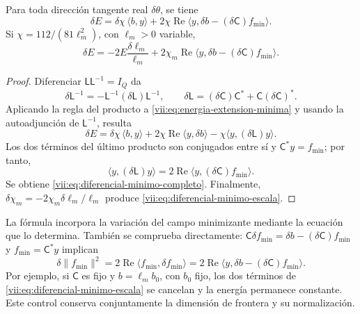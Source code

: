 \begin{theorem}
\label{vii:thm:diferencial-minimo}
Para toda dirección tangente real \(\delta\theta\), se tiene
\begin{equation}
 \delta E
 =\delta\chi\,\langle b,y\rangle
   +2\chi\operatorname{Re}
       \langle y,\delta b-(\delta\mathsf C)f_{\min}\rangle.
 \label{vii:eq:diferencial-minimo-completo}
\end{equation}
Si \(\chi=112/(81\ell_m^2)\), con \(\ell_m>0\) variable,
\begin{equation}
 \delta E=-2E\frac{\delta\ell_m}{\ell_m}
 +2\chi_m\operatorname{Re}
       \langle y,\delta b-(\delta\mathsf C)f_{\min}\rangle.
 \label{vii:eq:diferencial-minimo-escala}
\end{equation}
\end{theorem}

\begin{proof}
Diferenciar \(\mathsf L\mathsf L^{-1}=I_Q\) da
\[
 \delta\mathsf L^{-1}
 =-\mathsf L^{-1}(\delta\mathsf L)\mathsf L^{-1},\qquad
 \delta\mathsf L=(\delta\mathsf C)\mathsf C^*
                      +\mathsf C(\delta\mathsf C)^*.
\]
Aplicando la regla del producto a \eqref{vii:eq:energia-extension-minima}
y usando la autoadjunción de \(\mathsf L^{-1}\), resulta
\[
 \delta E=\delta\chi\,\langle b,y\rangle
 +2\chi\operatorname{Re}\langle y,\delta b\rangle
 -\chi\langle y,(\delta\mathsf L)y\rangle.
\]
Los dos términos del último producto son conjugados entre sí y
\(\mathsf C^*y=f_{\min}\); por tanto,
\[
 \langle y,(\delta\mathsf L)y\rangle
 =2\operatorname{Re}\langle y,(\delta\mathsf C)f_{\min}\rangle.
\]
Se obtiene \eqref{vii:eq:diferencial-minimo-completo}.
Finalmente, \(\delta\chi_m=-2\chi_m\delta\ell_m/\ell_m\)
produce \eqref{vii:eq:diferencial-minimo-escala}.
\end{proof}

La fórmula incorpora la variación del campo minimizante mediante la
ecuación que lo determina. También se comprueba directamente:
\(\mathsf C\delta f_{\min}=\delta b-(\delta\mathsf C)f_{\min}\)
y \(f_{\min}=\mathsf C^*y\) implican
\[
 \delta\|f_{\min}\|^2
 =2\operatorname{Re}\langle f_{\min},\delta f_{\min}\rangle
 =2\operatorname{Re}
     \langle y,\delta b-(\delta\mathsf C)f_{\min}\rangle.
\]
Por ejemplo, si \(\mathsf C\) es fijo y \(b=\ell_m b_0\), con
\(b_0\) fijo, los dos términos de
\eqref{vii:eq:diferencial-minimo-escala} se cancelan y la energía
permanece constante. Este control conserva conjuntamente la dimensión
de frontera y su normalización.

